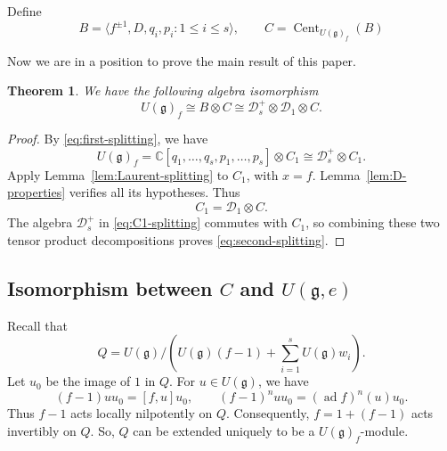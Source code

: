 \documentclass[12pt,a4paper]{amsart}
\numberwithin{equation}{section}
\newtheorem{theorem}{Theorem}[section]
\theoremstyle{definition}
\theoremstyle{remark}
\newcommand{\C}{\mathbb{C}}
\newcommand{\g}{\mathfrak g}
\newcommand{\D}{\mathcal D}
\newcommand{\Z}{\mathbb Z}
\newcommand{\N}{\mathbb Z_{\geq0}}
\newcommand{\ad}{\operatorname{ad}}
\newcommand{\Cent}{\operatorname{Cent}}
\newcommand{\Uf}{U(\g)_f}
\newcommand{\ba}{\mathbf{a}}
\newcommand{\bb}{\mathbf{b}}
\begin{document}
Define
\begin{equation}\label{eq:B-and-C}
 B=\langle f^{\pm1},D,q_i,p_i:1\leq i\leq s\rangle,
 \qquad C=\Cent_{\Uf}(B)
\end{equation}

Now we are in a position to prove the main result of this paper. 

\begin{theorem}\label{thm:centralizer}
We have the following  algebra isomorphism
\begin{equation}\label{eq:second-splitting}
 \Uf\cong B\otimes C \cong \D^+_s\otimes \D_1\otimes C.
\end{equation}

\end{theorem}

\begin{proof} By \eqref{eq:first-splitting}, we have \begin{equation}\label{eq:C1-splitting}
 \Uf=\C[q_1,\dots,q_s,p_1,\dots,p_s]\otimes C_1\cong \D^+_s\otimes C_1.
\end{equation}
Apply Lemma~\ref{lem:Laurent-splitting} to \(C_1\), with \(x=f\).
Lemma~\ref{lem:D-properties} verifies all its hypotheses.
Thus
\[
 C_1=\D_1\otimes C.
\]
The algebra \(\D^+_s\) in \eqref{eq:C1-splitting} commutes with
\(C_1\), so combining these two tensor product decompositions proves
\eqref{eq:second-splitting}.
\end{proof}


\subsection{\texorpdfstring{Isomorphism between $C$ and $U(\g,e)$}{Isomorphism between C and U(g,e)}}
\label{ssec:isomorphism}

Recall that $$Q=U(\g)\big/
 (U(\g)(f-1)+\sum_{i=1}^s U(\g)w_i).$$
Let $u_0$ be the image of $1$ in $Q$. For \(u\in U(\g)\), we have
\[
 (f-1)uu_0=[f,u]u_0,
 \qquad
 (f-1)^nuu_0=(\ad f)^n(u)u_0.
\]
Thus \(f-1\) acts locally nilpotently on \(Q\).
Consequently, \(f=1+(f-1)\) acts invertibly on $Q$.
So, $Q$ can be extended uniquely  to be a \(\Uf\)-module.
\end{document}

